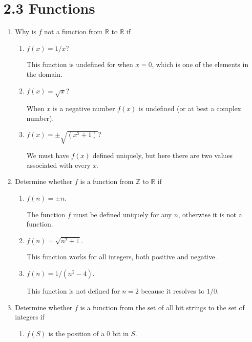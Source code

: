 \documentclass[11pt]{article}
\begin{document}
\section*{\textbf{2.3 Functions}}
\begin{enumerate}[label=\textbf{\arabic*.}]
	\item Why is $f$ not a function from $\mathbb{R}$ to $\mathbb{R}$ if
	
	\begin{enumerate}[label=\textbf{\alph*)}]
		\item $f(x) = 1/x$?
		
		This function is undefined for when $x = 0$, which is one of the elements in the domain.
		
		\item $f(x) = \sqrt{x}$?
		
		When $x$ is a negative number $f(x)$ is undefined (or at best a complex number).
		
		\item $f(x) = \pm \sqrt{(x^2 + 1)}$?
		
		We must have $f(x)$ defined uniquely, but here there are two values associated with every $x$.
	\end{enumerate}

	\item Determine whether $f$ is a function from $\mathbb{Z}$ to $\mathbb{R}$ if
	
	\begin{enumerate}[label=\textbf{\alph*)}]
		\item $f(n) = \pm n$.
		
		The function $f$ must be defined uniquely for any $n$, otherwise it is not a function.
		
		\item $f(n) = \sqrt{n^2 + 1}$.
		
		This function works for all integers, both positive and negative.
		
		\item $f(n) = 1/(n^2 - 4)$.
		
		This function is not defined for $n = 2$ because it resolves to $1/0$.
	\end{enumerate}

	\item Determine whether $f$ is a function from the set of all bit strings to the set of integers if
	
	\begin{enumerate}[label=\textbf{\alph*)}]
		\item $f(S)$ is the position of a 0 bit in $S$.
		

\end{enumerate}
\end{enumerate}
\end{document}
